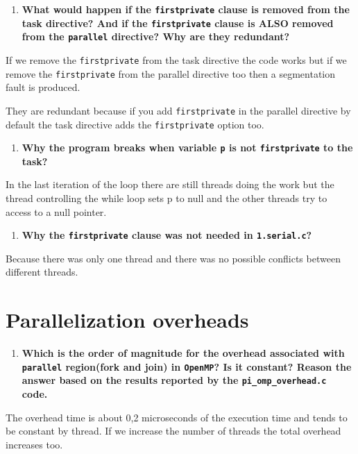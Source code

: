 \documentclass[a4paper]{article}
\begin{document}
\begin{enumerate}[resume]
	\item \textbf{What would happen if the \texttt{firstprivate} clause is removed from the task directive? And if the \texttt{firstprivate} clause is ALSO removed from the \texttt{parallel} directive? Why are they redundant?}
\end{enumerate}

If we remove the \texttt{firstprivate} from the task directive the code works but if we remove the \texttt{firstprivate} from the parallel directive too then a segmentation fault is produced. 

They are redundant because if you add \texttt{firstprivate} in the parallel directive by default the task directive adds the \texttt{firstprivate} option too.

\begin{enumerate}[resume]
	\item \textbf{Why the program breaks when variable \texttt{p} is not \texttt{firstprivate} to the task?}
\end{enumerate}

In the last iteration of the loop there are still threads doing the work but the thread controlling the while loop sets p to null and the other threads try to access to a null pointer.

\begin{enumerate}[resume]
	\item \textbf{Why the \texttt{firstprivate} clause was not needed in \texttt{1.serial.c}?}
\end{enumerate}

Because there was only one thread and there was no possible conflicts between different threads.

\section{Parallelization overheads}

\begin{enumerate}
	\item \textbf{Which is the order of magnitude for the overhead associated with \texttt{parallel} region(fork and join) in \texttt{OpenMP}? Is it constant? Reason the answer based on the results reported by the \texttt{pi\_omp\_overhead.c} code.}
\end{enumerate}

The overhead time is about 0,2 microseconds of the execution time and tends to be constant by thread. If we increase the number of threads the total overhead increases too.
\end{document}
